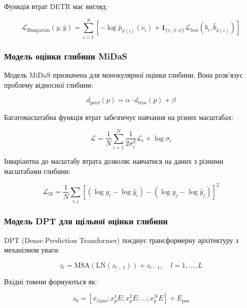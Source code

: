 \documentclass[14pt, a4paper]{extarticle}
\numberwithin{equation}{section}
\begin{document}
Функція втрат DETR має вигляд:

\begin{equation}
\boxed{\mathcal{L}_{\text{Hungarian}}(y, \hat{y}) = \sum_{i=1}^N \left[ -\log \hat{p}_{\hat{\sigma}(i)}(c_i) + \mathbf{1}_{\{c_i \neq \varnothing\}} \mathcal{L}_{\text{box}}(b_i, \hat{b}_{\hat{\sigma}(i)}) \right]} \tag{3.11}
\end{equation}

\subsubsection{Модель оцінки глибини MiDaS}

Модель MiDaS призначена для монокулярної оцінки глибини. Вона розв'язує проблему відносної глибини:

\begin{equation}
d_{\text{pred}}(p) = \alpha \cdot d_{\text{true}}(p) + \beta \tag{3.12}
\end{equation}

Багатомасштабна функція втрат забезпечує навчання на різних масштабах:

\begin{equation}
\mathcal{L} = \frac{1}{N} \sum_{i=1}^N \frac{1}{2\sigma_i^2} \mathcal{L}_i + \log \sigma_i \tag{3.13}
\end{equation}

Інваріантна до масштабу втрата дозволяє навчатися на даних з різними масштабами глибини:

\begin{equation}
\boxed{\mathcal{L}_{\text{SI}} = \frac{1}{N} \sum_{i,j} \left[ (\log y_i - \log \hat{y}_i) - (\log y_j - \log \hat{y}_j) \right]^2} \tag{3.14}
\end{equation}

\subsubsection{Модель DPT для щільної оцінки глибини}

DPT (Dense Prediction Transformer) поєднує трансформерну архітектуру з механізмом уваги:

\begin{equation}
z_l = \text{MSA}(\text{LN}(z_{l-1})) + z_{l-1}, \quad l=1,\ldots,L \tag{3.15}
\end{equation}

Вхідні токени формуються як:

\begin{equation}
z_0 = [x_{\text{class}}; x_p^1 E; x_p^2 E; \ldots; x_p^N E] + E_{\text{pos}} \tag{3.16}
\end{equation}
\end{document}
